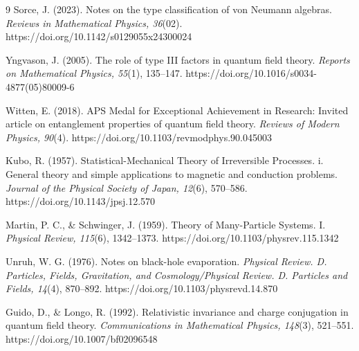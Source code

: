 \documentclass[a4paper,11pt]{article}
\begin{document}
\begin{thebibliography}{9}
Sorce, J. (2023). Notes on the type classification of von Neumann algebras. \emph{Reviews in Mathematical Physics, 36}(02). https://doi.org/10.1142/s0129055x24300024

Yngvason, J. (2005). The role of type III factors in quantum field theory. \emph{Reports on Mathematical Physics, 55}(1), 135–147. https://doi.org/10.1016/s0034-4877(05)80009-6

Witten, E. (2018). APS Medal for Exceptional Achievement in Research: Invited article on entanglement properties of quantum field theory. \emph{Reviews of Modern Physics, 90}(4). https://doi.org/10.1103/revmodphys.90.045003

Kubo, R. (1957). Statistical-Mechanical Theory of Irreversible Processes. i. General theory and simple applications to magnetic and conduction problems. \emph{Journal of the Physical Society of Japan, 12}(6), 570–586. https://doi.org/10.1143/jpsj.12.570

Martin, P. C., \& Schwinger, J. (1959). Theory of Many-Particle Systems. I. \emph{Physical Review, 115}(6), 1342–1373. https://doi.org/10.1103/physrev.115.1342

Unruh, W. G. (1976). Notes on black-hole evaporation. \emph{Physical Review. D. Particles, Fields, Gravitation, and Cosmology/Physical Review. D. Particles and Fields, 14}(4), 870–892. https://doi.org/10.1103/physrevd.14.870

Guido, D., \& Longo, R. (1992). Relativistic invariance and charge conjugation in quantum field theory. \emph{Communications in Mathematical Physics, 148}(3), 521–551. https://doi.org/10.1007/bf02096548

\end{thebibliography}
\end{document}

